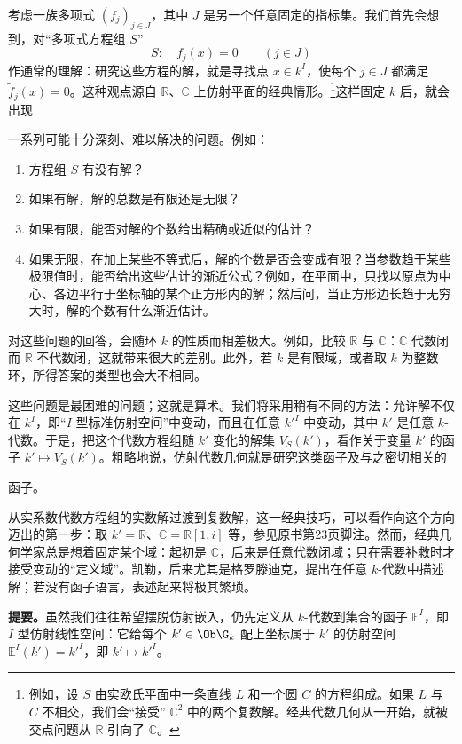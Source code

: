考虑一族多项式 $(f_j)_{j\in J}$，其中 $J$ 是另一个任意固定的指标集。我们首先会想到，对“多项式方程组 $S$”
\[
S:\quad f_j(x)=0\qquad(j\in J)\tag{4.1}
\]
作通常的理解：研究这些方程的解，就是寻找点 $x\in k^I$，使每个 $j\in J$ 都满足 $\widetilde f_j(x)=0$。这种观点源自 $\mathbb R$、$\mathbb C$ 上仿射平面的经典情形。\footnote{例如，设 $S$ 由实欧氏平面中一条直线 $L$ 和一个圆 $C$ 的方程组成。如果 $L$ 与 $C$ 不相交，我们会“接受” $\mathbb C^2$ 中的两个复数解。经典代数几何从一开始，就被交点问题从 $\mathbb R$ 引向了 $\mathbb C$。}这样固定 $k$ 后，就会出现

一系列可能十分深刻、难以解决的问题。例如：
\begin{enumerate}[label=\arabic*)]
\item 方程组 $S$ 有没有解？
\item 如果有解，解的总数是有限还是无限？
\item 如果有限，能否对解的个数给出精确或近似的估计？
\item 如果无限，在加上某些不等式后，解的个数是否会变成有限？当参数趋于某些极限值时，能否给出这些估计的渐近公式？例如，在平面中，只找以原点为中心、各边平行于坐标轴的某个正方形内的解；然后问，当正方形边长趋于无穷大时，解的个数有什么渐近估计。
\end{enumerate}
对这些问题的回答，会随环 $k$ 的性质而相差极大。例如，比较 $\mathbb R$ 与 $\mathbb C$：$\mathbb C$ 代数闭而 $\mathbb R$ 不代数闭，这就带来很大的差别。此外，若 $k$ 是有限域，或者取 $k$ 为整数环，所得答案的类型也会大不相同。

这些问题是最困难的问题；这就是算术。我们将采用稍有不同的方法：允许解不仅在 $k^I$，即“$I$ 型标准仿射空间”中变动，而且在任意 $k'^I$ 中变动，其中 $k'$ 是任意 $k$-代数。于是，把这个代数方程组随 $k'$ 变化的解集 $V_S(k')$，看作关于变量 $k'$ 的函子 $k'\mapsto V_S(k')$。粗略地说，仿射代数几何就是研究这类函子及与之密切相关的

函子。

从实系数代数方程组的实数解过渡到复数解，这一经典技巧，可以看作向这个方向迈出的第一步：取 $k'=\mathbb R$、$\mathbb C=\mathbb R[1,i]$ 等，参见原书第23页脚注。然而，经典几何学家总是想着固定某个域：起初是 $\mathbb C$，后来是任意代数闭域；只在需要补救时才接受变动的“定义域”。凯勒，后来尤其是格罗滕迪克，提出在任意 $k$-代数中描述解；若没有函子语言，表述起来将极其繁琐。

\textbf{提要。}虽然我们往往希望摆脱仿射嵌入，仍先定义从 $k$-代数到集合的函子 $\mathbb E^I$，即 $I$ 型仿射线性空间：它给每个 $k'\in\Ob\G_k$ 配上坐标属于 $k'$ 的仿射空间 $\mathbb E^I(k')=k'^I$，即 $k'\mapsto k'^I$。

